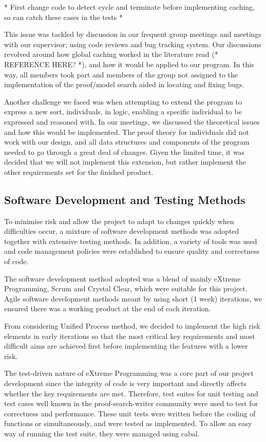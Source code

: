 * First change code to detect cycle and terminate before implementing caching, so can catch these cases in the tests *

This issue was tackled by discussion in our frequent group meetings and meetings with our supervisor; using code reviews and bug tracking system. Our discussions revolved around how global caching worked in the literature read (* REFERENCE HERE? *), and how it would be applied to our program. In this way, all members took part and members of the group not assigned to the implementation of the proof/model search aided in locating and fixing bugs.

Another challenge we faced was when attempting to extend the program to express a new sort, individuals, in logic, enabling a specific individual to be expressed and reasoned with. In our meetings, we discussed the theoretical issues and how this would be implemented. The proof theory for individuals did not work with our design, and all data structures and components of the program needed to go through a great deal of changes. Given the limited time, it was decided that we will not implement this extension, but rather implement the other requirements set for the finished product.

\subsection{Software Development and Testing Methods}

To minimise risk and allow the project to adapt to changes quickly when difficulties occur, a mixture of software development methods was adopted together with extensive testing methods. In addition, a variety of tools was used and code management policies were established to ensure quality and correctness of code.


The software development method adopted was a blend of mainly eXtreme Programming, Scrum and Crystal Clear, which were suitable for this project. Agile software development methods meant by using short (1 week) iterations, we ensured there was a working product at the end of each iteration.

From considering Unified Process method, we decided to implement the high risk elements in early iterations so that the most critical key requirements and most difficult aims are achieved first before implementing the features with a lower risk.

The test-driven nature of eXtreme Programming was a core part of our project development since the integrity of code is very important and directly affects whether the key requirements are met. Therefore, test suites for unit testing and test cases well known in the proof-search-writer community were used to test for correctness and performance. These unit tests were written before the coding of functions or simultaneously, and were tested as implemented. To allow an easy way of running the test suite, they were managed using cabal.

